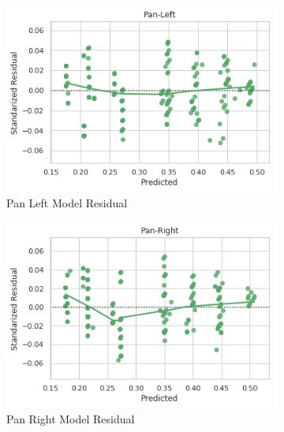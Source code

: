 \documentclass{l4proj}
\begin{document}
\begin{figure}[H]
  \begin{subfigure}[b]{0.5\textwidth}
    \includegraphics[width=\textwidth]{l4template-master/images/pan_left_residual.png}
    \caption{Pan Left Model Residual}
    \label{panleftmodelres}
  \end{subfigure}
  \begin{subfigure}[b]{0.5\textwidth}
    \includegraphics[width=\textwidth]{l4template-master/images/pan_right_residual.png}
    \caption{Pan Right Model Residual}
    \label{panrightmodelres}
  \end{subfigure}
  \begin{subfigure}[b]{0.5\textwidth}

\end{subfigure}
\end{figure}
\end{document}
